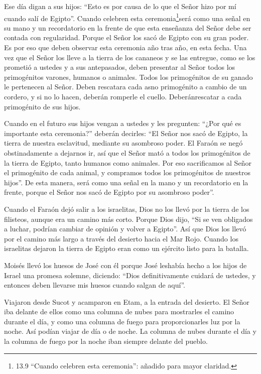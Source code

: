  Ese día digan a sus hijos: ``Esto es por causa de lo que el
Señor hizo por mí cuando salí de Egipto''.  Cuando celebren
esta ceremonia\footnote{13.9 ``Cuando celebren esta ceremonia'': añadido
  para mayor claridad.}será como una señal en su mano y un recordatorio
en la frente de que esta enseñanza del Señor debe ser contada con
regularidad. Porque el Señor los sacó de Egipto con su gran poder.
 Es por eso que deben observar esta ceremonia año tras año,
en esta fecha.  Una vez que el Señor los lleve a la tierra
de los cananeos y se las entregue, como se los prometió a ustedes y a
sus antepasados,  deben presentar al Señor todos los
primogénitos varones, humanos o animales. Todos los primogénitos de su
ganado le pertenecen al Señor.  Deben rescatara cada asno
primogénito a cambio de un cordero, y si no lo hacen, deberán romperle
el cuello. Deberánrescatar a cada primogénito de sus hijos.

 Cuando en el futuro sus hijos vengan a ustedes y les
pregunten: ``¿Por qué es importante esta ceremonia?'' deberán decirles:
``El Señor nos sacó de Egipto, la tierra de nuestra esclavitud, mediante
su asombroso poder.  El Faraón se negó obstinadamente a
dejarnos ir, así que el Señor mató a todos los primogénitos de la tierra
de Egipto, tanto humanos como animales. Por eso sacrificamos al Señor el
primogénito de cada animal, y compramos todos los primogénitos de
nuestros hijos''.  De esta manera, será como una señal en
la mano y un recordatorio en la frente, porque el Señor nos sacó de
Egipto por su asombroso poder''.

 Cuando el Faraón dejó salir a los israelitas, Dios no los
llevó por la tierra de los filisteos, aunque era un camino más corto.
Porque Dios dijo, ``Si se ven obligados a luchar, podrían cambiar de
opinión y volver a Egipto''.  Así que Dios los llevó por el
camino más largo a través del desierto hacia el Mar Rojo. Cuando los
israelitas dejaron la tierra de Egipto eran como un ejército listo para
la batalla.

 Moisés llevó los huesos de José con él porque José
leshabía hecho a los hijos de Israel una promesa solemne, diciendo:
``Dios definitivamente cuidará de ustedes, y entonces deben llevarse mis
huesos cuando salgan de aquí''.

 Viajaron desde Sucot y acamparon en Etam, a la entrada del
desierto.  El Señor iba delante de ellos como una columna
de nubes para mostrarles el camino durante el día, y como una columna de
fuego para proporcionarles luz por la noche. Así podían viajar de día o
de noche.  La columna de nubes durante el día y la columna
de fuego por la noche iban siempre delante del pueblo.

